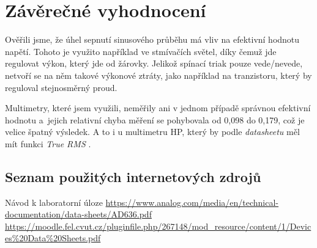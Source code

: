 \documentclass[a4paper,12pt]{article}   %
\begin{document}
\section{Závěrečné vyhodnocení}
Ověřili jsme, že úhel sepnutí sinusového průběhu má vliv na efektivní hodnotu napětí. Tohoto je využito například ve stmívačích světel, díky čemuž jde regulovat výkon, který jde od žárovky. Jelikož spínací triak pouze vede/nevede, netvoří se na něm takové výkonové ztráty, jako například na tranzistoru, který by reguloval stejnosměrný proud.

Multimetry, které jsem využili, neměřily ani v jednom případě správnou efektivní hodnotu a~jejich relativní chyba měření se pohybovala od 0,098 do 0,179, což je velice špatný výsledek. A to i u multimetru HP, který by podle \textit{datasheetu} měl mít funkci \textit{True RMS} \cite{datasheet_multimetry}.


\clearpage
\renewcommand{\refname}{Seznam použité literatury a~zdrojů informací} 

\begin{thebibliography}{99}

\subsection*{Seznam použitých internetových zdrojů}
     Návod k laboratorní úloze
     \url{https://www.analog.com/media/en/technical-documentation/data-sheets/AD636.pdf}
     \url{https://moodle.fel.cvut.cz/pluginfile.php/267148/mod_resource/content/1/Devices%20Data%20Sheets.pdf}
    
\end{thebibliography}
\end{document}
